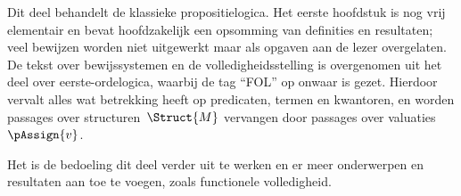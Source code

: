 \documentclass[openany]{memoir}
\begin{document}
\begingroup
\def\olfilename{OLP-0055}
\def\olfilepath{content/propositional-logic/}
\hypertarget{unit-OLP-0055}{}




\begin{editorial}
  Dit deel behandelt de klassieke propositielogica. Het eerste hoofdstuk
  is nog vrij elementair en bevat hoofdzakelijk een opsomming van
  definities en resultaten; veel bewijzen worden niet uitgewerkt maar
  als opgaven aan de lezer overgelaten. De tekst over bewijssystemen en
  de volledigheidsstelling is overgenomen uit het deel over
  eerste-ordelogica, waarbij de tag ``FOL'' op onwaar is gezet. Hierdoor
  vervalt alles wat betrekking heeft op predicaten, termen en kwantoren,
  en worden passages over structuren~$\Struct{M}$ vervangen door
  passages over valuaties~$\pAssign{v}$.

  Het is de bedoeling dit deel verder uit te werken en er meer
  onderwerpen en resultaten aan toe te voegen, zoals
  functionele volledigheid.
\end{editorial}









\endgroup

\begingroup
\def\olfilename{OLP-0056}
\def\olfilepath{content/propositional-logic/syntax-and-semantics/}
\hypertarget{unit-OLP-0056}{}
\end{document}
